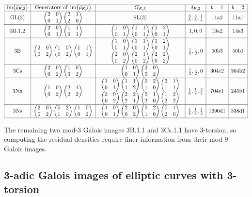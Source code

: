 \documentclass{article}
\theoremstyle{plain}
\theoremstyle{definition}
\newcommand{\GL}{\operatorname{GL}}
\newcommand{\im}{\operatorname{im}}
\newcommand{\SL}{\operatorname{SL}}
\newcommand{\br}{\!\del}
\newcommand{\twobytwo}[4]{\begin{pmatrix} #1 & #2 \\ #3 & #4 \end{pmatrix}}
\begin{document}
$$
\begin{array}{|c|c|c|c|c|c|}
\hline
\im\br{\overline{\rho_{E, 3}}} & \text{Generators of} \ \im\br{\overline{\rho_{E, 3}}} & G_{E, 3} & \delta_{E, 3} & b = 1 & b = 2 \\
\hline
\GL\br{3} & \twobytwo{2}{0}{0}{1} \twobytwo{2}{1}{2}{0} & \SL\br{3} & \tfrac{3}{8}, \tfrac{3}{8}, \tfrac{1}{4} & \text{11a2} & \text{11a1} \\
\hline
\text{3B.1.2} & \twobytwo{2}{0}{0}{1} \twobytwo{1}{1}{0}{1} & \twobytwo{1}{0}{0}{1} \twobytwo{1}{1}{0}{1} \twobytwo{1}{2}{0}{1} & 1, 0, 0 & \text{19a2} & \text{14a3} \\
\hline
\text{3B} & \twobytwo{2}{0}{0}{2} \twobytwo{1}{0}{0}{2} \twobytwo{1}{1}{0}{1} & \begin{array}{c} \twobytwo{1}{0}{0}{1} \twobytwo{1}{1}{0}{1} \twobytwo{1}{2}{0}{1} \\ \twobytwo{2}{0}{0}{2} \twobytwo{2}{1}{0}{2} \twobytwo{2}{2}{0}{2} \end{array} & \tfrac{1}{2}, \tfrac{1}{2}, 0 & \text{50b3} & \text{50b1} \\
\hline
\text{3Cs} & \twobytwo{2}{0}{0}{2} \twobytwo{1}{0}{0}{2} & \twobytwo{1}{0}{0}{1} \twobytwo{2}{0}{0}{2} & \tfrac{1}{2}, \tfrac{1}{2}, 0 & \text{304e2} & \text{304b2} \\
\hline
\text{3Nn} & \twobytwo{1}{0}{0}{2} \twobytwo{2}{1}{2}{2} & \begin{array}{c} \twobytwo{1}{0}{0}{1} \twobytwo{1}{1}{1}{2} \twobytwo{0}{2}{1}{0} \twobytwo{2}{1}{1}{1} \\ \twobytwo{2}{0}{0}{2} \twobytwo{2}{2}{2}{1} \twobytwo{0}{1}{2}{0} \twobytwo{1}{2}{2}{2} \end{array} & \tfrac{1}{8}, \tfrac{1}{8}, \tfrac{3}{4} & \text{704e1} & \text{245b1} \\
\hline
\text{3Ns} & \twobytwo{2}{0}{0}{2} \twobytwo{0}{2}{1}{0} \twobytwo{1}{0}{0}{2} & \twobytwo{1}{0}{0}{1} \twobytwo{2}{0}{0}{2} \twobytwo{0}{2}{1}{0} \twobytwo{0}{1}{2}{0} & \tfrac{1}{4}, \tfrac{1}{4}, \tfrac{1}{2} & \text{1690d1} & \text{338d1} \\
\hline
\end{array}
$$

\vspace{0.5cm}

The remaining two mod-$ 3 $ Galois images 3B.1.1 and 3Cs.1.1 have $ 3 $-torsion, so computing the residual densities require finer information from their mod-$ 9 $ Galois images.

\subsection*{3-adic Galois images of elliptic curves with 3-torsion}
\end{document}
